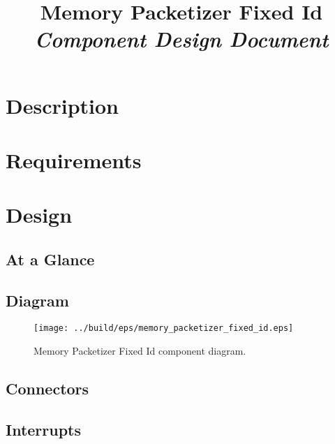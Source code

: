 



\title{\textbf{Memory Packetizer Fixed Id} \\
\large\textit{Component Design Document}}
\date{}
\maketitle

\section{Description}


\section{Requirements}


\section{Design}

\subsection{At a Glance}


\subsection{Diagram}
\begin{figure}[H]
  \texttt{[image: ../build/eps/memory\_packetizer\_fixed\_id.eps]}
  \caption{Memory Packetizer Fixed Id component diagram.}
\end{figure}

\subsection{Connectors}


\subsection{Interrupts}



